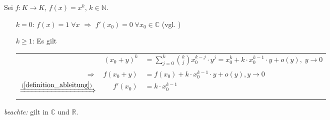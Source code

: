 \begin{example}
	Sei $f:K\to K$, $f(x) = x^k$, $k\in\mathbb{N}$.
	\begin{itemize}[leftmargin=]
		\item[$k=0$:] $f(x) = 1\;\forall x$ $\Rightarrow$ $f'(x_0) = 0\;\forall x_0\in\mathbb{C}$ (vgl. )
		\item[$k\ge 1$:] Es gilt \\
		\renewcommand{\arraystretch}{1.2}
		\begin{tabularx}{\linewidth}{r@{\ \ }r@{$\,$}X}
			& $(x_0 + y)^k$ & $\displaystyle = \sum_{j=0}^{k}\binom{k}{j} x_0^{k-j}\cdot y^j = x_0^k + k\cdot x_0^{k-1}\cdot y + o(y),\;y\to 0$ \\
			$\Rightarrow$ & $f(x_0 + y)$ & $= f(x_0) + k\cdot x_0^{k-1}\cdot y + o(y), y\to 0$ \\
			$\xRightarrow{(\ref{definition_ableitung})}$ & $f'(x_0)$ & $= k\cdot x_0^{k-1}$
		\end{tabularx}
	\end{itemize}
	\emph{beachte:} gilt in $\mathbb{C}$ und $\mathbb{R}$.
	\begin{center}\end{center}
\end{example}

